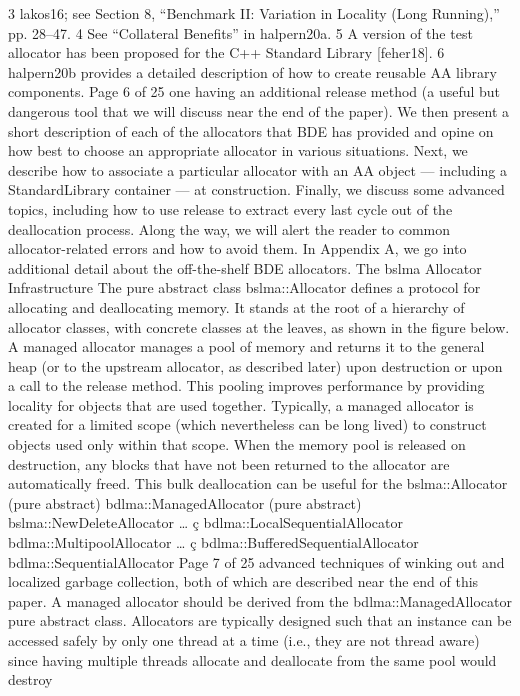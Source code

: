 3 lakos16; see Section 8, “Benchmark II: Variation in Locality (Long Running),” pp. 28–47. 4 See “Collateral Benefits” in halpern20a. 5 A version of the test allocator has been proposed for the C++ Standard Library [feher18].
6 halpern20b provides a detailed description of how to create reusable AA library components.
Page 6 of 25
one having an additional release method (a useful but dangerous tool that we
will discuss near the end of the paper). We then present a short description of
each of the allocators that BDE has provided and opine on how best to choose
an appropriate allocator in various situations. Next, we describe how to
associate a particular allocator with an AA object — including a StandardLibrary container — at construction. Finally, we discuss some advanced topics,
including how to use release to extract every last cycle out of the deallocation
process. Along the way, we will alert the reader to common allocator-related
errors and how to avoid them. In Appendix A, we go into additional detail about
the off-the-shelf BDE allocators.
The bslma Allocator Infrastructure
The pure abstract class bslma::Allocator defines a protocol for allocating and
deallocating memory. It stands at the root of a hierarchy of allocator classes,
with concrete classes at the leaves, as shown in the figure below.
A managed allocator manages a pool of memory and returns it to the general
heap (or to the upstream allocator, as described later) upon destruction or
upon a call to the release method. This pooling improves performance by
providing locality for objects that are used together. Typically, a managed
allocator is created for a limited scope (which nevertheless can be long lived) to
construct objects used only within that scope. When the memory pool is
released on destruction, any blocks that have not been returned to the
allocator are automatically freed. This bulk deallocation can be useful for the
bslma::Allocator
(pure abstract)
bdlma::ManagedAllocator
(pure abstract) bslma::NewDeleteAllocator …
ç
bdlma::LocalSequentialAllocator
bdlma::MultipoolAllocator …
ç
bdlma::BufferedSequentialAllocator
bdlma::SequentialAllocator
Page 7 of 25
advanced techniques of winking out and localized garbage collection, both of
which are described near the end of this paper. A managed allocator should be
derived from the bdlma::ManagedAllocator pure abstract class.
Allocators are typically designed such that an instance can be accessed safely
by only one thread at a time (i.e., they are not thread aware) since having
multiple threads allocate and deallocate from the same pool would destroy
